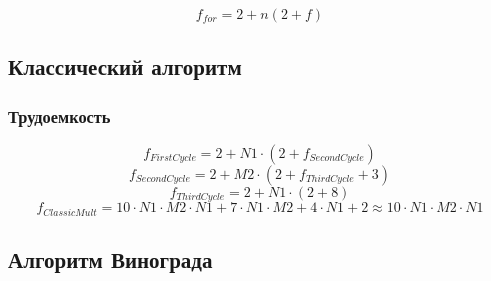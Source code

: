     \begin{equation}\label{formula:ForTrud}
    f_{for} = 2 + n(2 + f) 
    \end{equation}

    \subsection{Классический алгоритм}

    \subsubsection*{Трудоемкость}
    \begin{equation}
    f_{FirstCycle} = 2 + N1 \cdot (2+ f_{SecondCycle})
    \end{equation}
    \begin{equation}
    f_{SecondCycle} = 2 + M2 \cdot (2 + f_{ThirdCycle} + 3)
    \end{equation}
    \begin{equation}
    f_{ThirdCycle} = 2 + N1 \cdot (2+ 8)
    \end{equation}
    \begin{equation}
    f_{ClassicMult} = 10 \cdot N1 \cdot M2 \cdot N1 + 7\cdot N1 \cdot M2 + 4 \cdot N1 + 2 \approx 10\cdot N1 \cdot M2 \cdot N1
    \end{equation}

    \subsection{Алгоритм Винограда}

